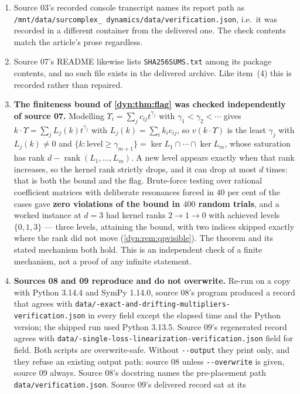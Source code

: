 \documentclass[11pt,letterpaper]{article}
\theoremstyle{definition}
\theoremstyle{remark}
\newcommand{\rank}{\operatorname{rank}}
\numberwithin{equation}{section}
\begin{document}
\begin{enumerate}[label=(\arabic*)]
\item Source 03's recorded console transcript names its report path as
\texttt{/mnt/\allowbreak data/\allowbreak surcomplex\_\allowbreak
dynamics/\allowbreak data/\allowbreak verification.\allowbreak json},
i.e.\ it
was recorded in a different container from the delivered one. The check
contents match the article's prose regardless.
\item Source 07's README likewise lists \texttt{SHA256SUMS.txt} among its
package contents, and no such file exists in the delivered archive. Like
item~(4) this is recorded rather than repaired.
\item \textbf{The finiteness bound of \cref{dyn:thm:flag} was checked
independently of source 07.} Modelling
$\Upsilon_i=\sum_jc_{ij}t^{\gamma_j}$ with $\gamma_1<\gamma_2<\cdots$ gives
$k\cdot\Upsilon=\sum_jL_j(k)t^{\gamma_j}$ with
$L_j(k)=\sum_ik_ic_{ij}$, so $v(k\cdot\Upsilon)$ is the least $\gamma_j$
with $L_j(k)\ne0$ and
$\{k:\text{level}\ge\gamma_{m+1}\}=\ker L_1\cap\cdots\cap\ker L_m$, whose
saturation has rank $d-\rank(L_1,\dots,L_m)$. A new level appears exactly
when that rank increases, so the kernel rank strictly drops, and it can
drop at most $d$ times: that is both the bound and the flag. Brute-force
testing over rational coefficient matrices with deliberate resonances
forced in $40$ per cent of the cases gave \textbf{zero violations of the
bound in $400$ random trials}, and a worked instance at $d=3$ had kernel
ranks $2\to1\to0$ with achieved levels $\{0,1,3\}$ --- three levels,
attaining the bound, with two indices skipped exactly where the rank did
not move (\cref{dyn:rem:qpvisible}). The theorem and its stated mechanism
both hold. This is an independent check of a finite mechanism, not a proof
of any infinite statement.
\item \textbf{Sources 08 and 09 reproduce and do not overwrite.} Re-run on a
copy with Python 3.14.4 and SymPy 1.14.0, source 08's program produced a
record that agrees with
\texttt{data/-exact-and-drifting-multipliers-verification.json}
in every field except the elapsed time and the Python version; the shipped
run used Python 3.13.5. Source 09's regenerated record agrees with
\texttt{data/-single-loss-linearization-verification.json}
field for field. Both scripts are overwrite-safe. Without
\texttt{-{}-output} they print only, and they refuse an existing output
path: source 08 unless \texttt{-{}-overwrite} is given, source 09 always.
Source 08's docstring names the pre-placement path
\texttt{data/verification.json}. Source 09's delivered record sat at its

\end{enumerate}
\end{document}
